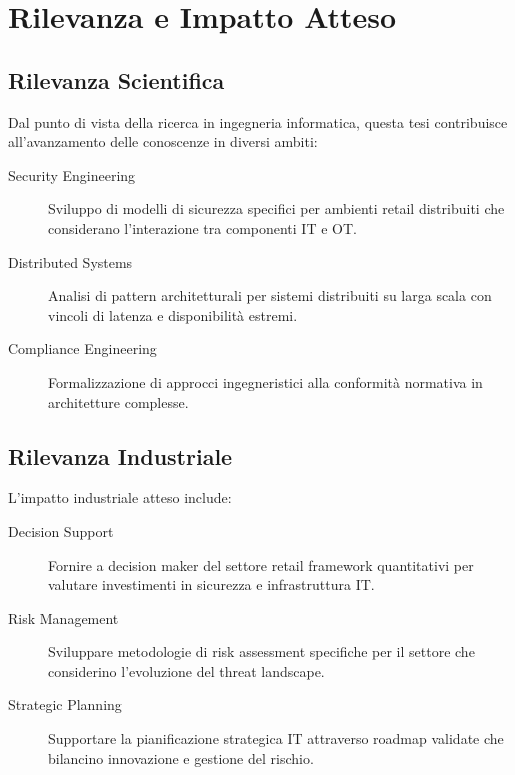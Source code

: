 \section{Rilevanza e Impatto Atteso}
\label{sec:rilevanza-impatto}

\subsection{Rilevanza Scientifica}
\label{subsec:rilevanza-scientifica}

Dal punto di vista della ricerca in ingegneria informatica, questa tesi contribuisce all'avanzamento delle conoscenze in diversi ambiti:

\begin{description}
    \item[Security Engineering] Sviluppo di modelli di sicurezza specifici per ambienti retail distribuiti che considerano l'interazione tra componenti IT e OT.
    
    \item[Distributed Systems] Analisi di pattern architetturali per sistemi distribuiti su larga scala con vincoli di latenza e disponibilità estremi.
    
    \item[Compliance Engineering] Formalizzazione di approcci ingegneristici alla conformità normativa in architetture complesse.
\end{description}

\subsection{Rilevanza Industriale}
\label{subsec:rilevanza-industriale}

L'impatto industriale atteso include:

\begin{description}
    \item[Decision Support] Fornire a decision maker del settore retail framework quantitativi per valutare investimenti in sicurezza e infrastruttura IT.
    
    \item[Risk Management] Sviluppare metodologie di risk assessment specifiche per il settore che considerino l'evoluzione del threat landscape.
    
    \item[Strategic Planning] Supportare la pianificazione strategica IT attraverso roadmap validate che bilancino innovazione e gestione del rischio.
\end{description}

